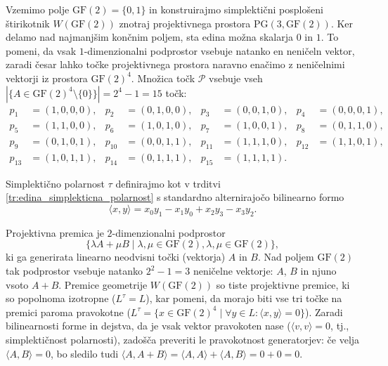 \documentclass[fin1, tisk]{fmfdelo}
\newcommand{\PP}{\mathcal{P}}
\newcommand{\PG}{\mathrm{PG}}
\newcommand{\GF}{\mathrm{GF}}
\begin{document}
\begin{zgled}\label{zgled:simplekticni_dolly}
    Vzemimo polje $\GF(2) = \{0,1\}$ in konstruirajmo simplektični posplošeni štirikotnik 
    $W(\GF(2))$ znotraj projektivnega prostora $\PG(3, \GF(2))$. Ker delamo nad najmanjšim 
    končnim poljem, sta edina možna skalarja $0$ in $1$. To pomeni, da vsak $1$-dimenzionalni 
    podprostor vsebuje natanko en neničeln vektor, zaradi česar lahko točke projektivnega prostora naravno 
    enačimo z neničelnimi vektorji iz prostora $\GF(2)^4$. Množica točk $\PP$ vsebuje vseh 
    $|\{A\in \GF(2)^4\setminus \{0\}\}| = 2^4 - 1 = 15$ točk:
    \begin{align*}
        p_1 &= (1,0,0,0), & p_2 &= (0,1,0,0), & p_3 &= (0,0,1,0), & p_4 &= (0,0,0,1), \\
        p_5 &= (1,1,0,0), & p_6 &= (1,0,1,0), & p_7 &= (1,0,0,1), & p_8 &= (0,1,1,0), \\
        p_9 &= (0,1,0,1), & p_{10} &= (0,0,1,1), & p_{11} &= (1,1,1,0), & p_{12} &= (1,1,0,1), \\
        p_{13} &= (1,0,1,1), & p_{14} &= (0,1,1,1), & p_{15} &= (1,1,1,1).
    \end{align*}

    Simplektično polarnost $\tau$ definirajmo kot v trditvi \ref{tr:edina_simplekticna_polarnost}
    s standardno alternirajočo bilinearno formo
    \[ \langle x, y \rangle = x_0 y_1 - x_1 y_0 + x_2 y_3 - x_3 y_2. \]

    Projektivna premica je $2$-dimenzionalni podprostor 
    \[\{\lambda A + \mu B \mid \lambda, \mu \in \GF(2), \lambda, \mu\in\GF(2)\},\] 
    ki ga generirata linearno neodvisni 
    točki (vektorja) $A$ in $B$. Nad poljem $\GF(2)$ tak podprostor vsebuje natanko 
    $2^2 - 1 = 3$ neničelne vektorje: $A$, $B$ in njuno vsoto $A+B$. Premice geometrije 
    $W(\GF(2))$ so tiste projektivne premice, ki so popolnoma izotropne ($L^\tau = L$), 
    kar pomeni, da morajo biti vse tri točke na premici paroma pravokotne 
    ($L^\tau = \{x\in\GF(2)^4\mid \forall y\in L: \langle x, y \rangle = 0\}$). Zaradi bilinearnosti 
    forme in dejstva, da je vsak vektor pravokoten nase ($\langle v, v \rangle = 0$, tj., simplektičnost polarnosti), zadošča 
    preveriti le pravokotnost generatorjev: če velja $\langle A, B \rangle = 0$, bo
    sledilo tudi $\langle A, A+B \rangle = \langle A, A \rangle + \langle A, B \rangle = 0 + 0 = 0$.


\end{zgled}
\end{document}
